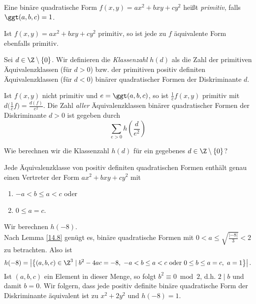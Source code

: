 
\begin{defn*}
	Eine binäre quadratische Form $f(x,y) = ax^2+bxy+cy^2$ heißt \emph{primitiv}, falls $\ggt(a,b,c)=1$.
\end{defn*}

\begin{rem*}
	Ist $f(x,y)=ax^2+bxy+cy^2$ primitiv, so ist jede zu $f$ äquivalente Form ebenfalls primitiv.
\end{rem*}

\begin{defn*}[Klassenzahl]
	Sei $d \in \Z\setminus\{0\}$. Wir definieren die \emph{Klassenzahl} $h(d)$ als die Zahl der primitiven Äquivalenzklassen (für $d>0$) bzw. der primitiven positiv definiten Äquivalenzklassen (für $d<0$) binärer quadratischer Formen der Diskriminante $d$.
\end{defn*}

\begin{rem*}
	Ist $f(x,y)$ nicht primitiv und $e = \ggt(a,b,c)$, so ist $\frac{1}{e}f(x,y)$ primitiv mit $d\big(\frac{1}{e}f\big) = \frac{d(f)}{e^2}$. Die Zahl \textit{aller} Äquivalenzklassen binärer quadratischer Formen der Diskriminante $d>0$ ist gegeben durch
	\[ \sum_{e>0} h \left( \frac{d}{e^2} \right) \]
\end{rem*}

\begin{frage*}
	Wie berechnen wir die Klassenzahl $h(d)$ für ein gegebenes $d \in \Z \setminus \{0\}$?
\end{frage*}

\begin{thm}\autolabel
	Jede Äquivalenzklasse von positiv definiten quadratischen Formen enthält genau einen Vertreter der Form $ax^2+bxy+cy^2$ mit
	\begin{enumerate}[label={\roman*})]
		\item $-a < b \leq a < c$ oder
		\item $0 \leq a = c$.
	\end{enumerate}
\end{thm}

\begin{exmp*}
	Wir berechnen $h(-8)$.\\
	Nach Lemma \ref{14.8} genügt es, binäre quadratische Formen mit $0 < a \leq \sqrt{\frac{|-8|}{3}} < 2$ zu betrachten. Also ist
	\[ h(-8) = \left| \left\{ (a,b,c) \in \Z^3 \mid b^2-4ac=-8,\ -a < b \leq a < c \ \text{oder } 0 \leq b \leq a = c,\ a = 1 \right\} \right|. \]
	Ist $(a,b,c)$ ein Element in dieser Menge, so folgt $b^2 \equiv 0 \bmod 2$, d.h. $2 \mid b$ und damit $b=0$. Wir folgern, dass jede positiv definite binäre quadratische Form der Diskriminante äquivalent ist zu $x^2+2y^2$ und $h(-8)=1$.
\end{exmp*}

